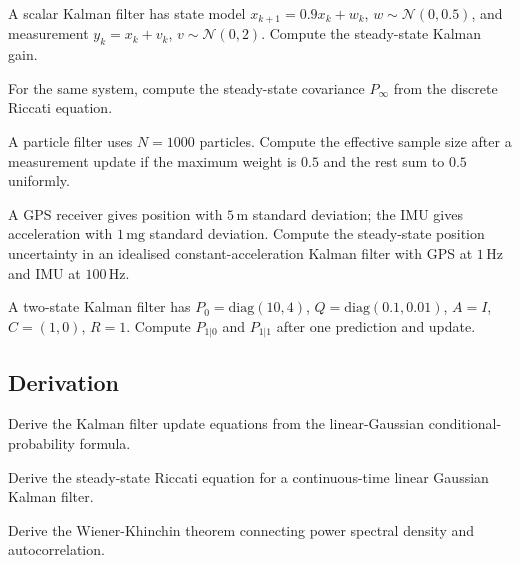 \begin{exercise}
A scalar Kalman filter has state model $x_{k+1} = 0.9 x_k + w_k$, $w \sim \mathcal{N}(0, 0.5)$, and measurement $y_k = x_k + v_k$, $v \sim \mathcal{N}(0, 2)$. Compute the steady-state Kalman gain.
\end{exercise}

\begin{exercise}
For the same system, compute the steady-state covariance $P_\infty$ from the discrete Riccati equation.
\end{exercise}

\begin{exercise}
A particle filter uses $N = 1000$ particles. Compute the effective sample size after a measurement update if the maximum weight is $0.5$ and the rest sum to $0.5$ uniformly.
\end{exercise}

\begin{exercise}
A GPS receiver gives position with $5\,\text{m}$ standard deviation; the IMU gives acceleration with $1\,\text{mg}$ standard deviation. Compute the steady-state position uncertainty in an idealised constant-acceleration Kalman filter with GPS at $1\,\text{Hz}$ and IMU at $100\,\text{Hz}$.
\end{exercise}

\begin{exercise}
A two-state Kalman filter has $P_0 = \text{diag}(10, 4)$, $Q = \text{diag}(0.1, 0.01)$, $A = I$, $C = (1, 0)$, $R = 1$. Compute $P_{1|0}$ and $P_{1|1}$ after one prediction and update.
\end{exercise}

\subsection*{Derivation}

\begin{exercise}
Derive the Kalman filter update equations from the linear-Gaussian conditional-probability formula.
\end{exercise}

\begin{exercise}
Derive the steady-state Riccati equation for a continuous-time linear Gaussian Kalman filter.
\end{exercise}

\begin{exercise}
Derive the Wiener-Khinchin theorem connecting power spectral density and autocorrelation.
\end{exercise}

